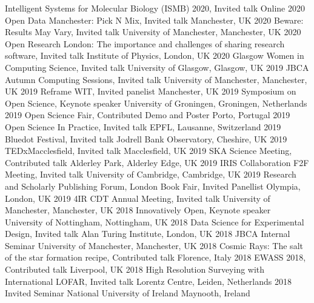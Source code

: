 \begin{cvpress} 
   \cvpres
    {Intelligent Systems for Molecular Biology (ISMB) 2020, Invited talk}
    {Online}
    {2020}
   \cvpres
    {Open Data Manchester: Pick N Mix, Invited talk}
    {Manchester, UK}
    {2020}
   \cvpres
    {Beware: Results May Vary, Invited talk}
    {University of Manchester, Manchester, UK}
    {2020}
   \cvpres
    {Open Research London: The importance and challenges of sharing research software, Invited talk}
    {Institute of Physics, London, UK}
    {2020}
   \cvpres
    {Glasgow Women in Computing Science, Invited talk}
    {University of Glasgow, Glasgow, UK}
    {2019}
   \cvpres
    {JBCA Autumn Computing Sessions, Invited talk}
    {University of Manchester, Manchester, UK}
    {2019}
   \cvpres
    {Reframe WIT, Invited panelist}
    {Manchester, UK}
    {2019}
   \cvpres
    {Symposium on Open Science, Keynote speaker}
    {University of Groningen, Groningen, Netherlands}
    {2019}
   \cvpres
    {Open Science Fair, Contributed Demo and Poster}
    {Porto, Portugal}
    {2019} 
   \cvpres
    {Open Science In Practice, Invited talk}
    {EPFL, Lausanne, Switzerland}
    {2019} 
   \cvpres
    {Bluedot Festival, Invited talk}
    {Jodrell Bank Observatory, Cheshire, UK}
    {2019} 
   \cvpres
    {TEDxMacclesfield, Invited talk}
    {Macclesfield, UK}
    {2019} 
   \cvpres
    {SKA Science Meeting, Contributed talk}
    {Alderley Park, Alderley Edge, UK}
    {2019}  
   \cvpres
    {IRIS Collaboration F2F Meeting, Invited talk}
    {University of Cambridge, Cambridge, UK}
    {2019}  
   \cvpres
    {Research and Scholarly Publishing Forum, London Book Fair, Invited Panellist}
    {Olympia, London, UK}
    {2019} 
   \cvpres
    {4IR CDT Annual Meeting, Invited talk}
    {University of Manchester, Manchester, UK}
    {2018}  
   \cvpres
    {Innovatively Open, Keynote speaker}
    {University of Nottingham, Nottingham, UK}
    {2018}  
   \cvpres
    {Data Science for Experimental Design, Invited talk}
    {Alan Turing Institute, London, UK}
    {2018}  
   \cvpres
    {JBCA Internal Seminar}
    {University of Manchester, Manchester, UK}
    {2018}   
   \cvpres
    {Cosmic Rays: The salt of the star formation recipe, Contributed talk}
    {Florence, Italy}
    {2018}
   \cvpres
    {EWASS 2018, Contributed talk}
    {Liverpool, UK}
    {2018}
\cvpres
    {High Resolution Surveying with International LOFAR, Invited talk}
    {Lorentz Centre, Leiden, Netherlands}
    {2018}
   \cvpres
    {Invited Seminar}
    {National University of Ireland Maynooth, Ireland}

\end{cvpress}
